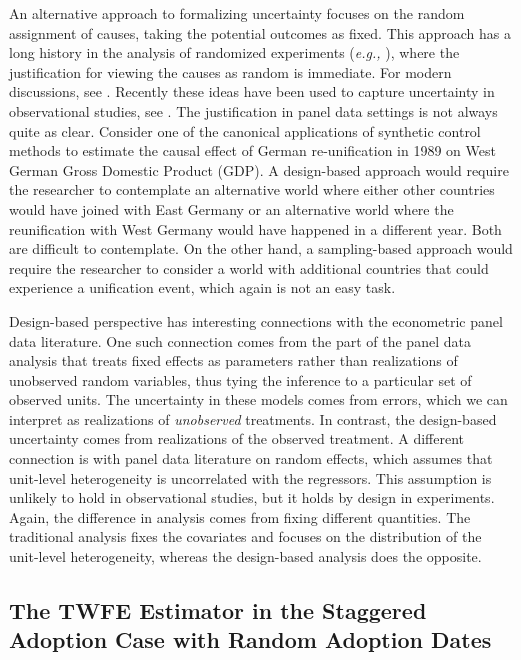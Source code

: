 \documentclass[letterpaper,12pt,leqno]{article}
\begin{document}
An alternative approach to formalizing uncertainty focuses on the random assignment of causes, taking the potential outcomes as fixed.
This approach has a long history in the analysis of randomized experiments 
({\it e.g.,} \citep{fisher1937design, neyman1923}), where the justification for viewing the causes as random is immediate. For modern discussions, see \citep{imbens2015causal, rosenbaum2023causal}.
Recently these ideas have been used to capture uncertainty in observational studies, see
\citep{abadie2020sampling, abadie2023should}. The justification in panel data settings is not always quite as clear.
Consider one of the canonical applications of synthetic control methods to estimate the causal effect of German re-unification in 1989 on West German Gross Domestic Product (GDP). 
A design-based approach would require the researcher to contemplate an alternative world where either other countries would have joined with East Germany or an alternative world where the reunification with West Germany would have happened in a different year. Both are difficult to contemplate. On the other hand, a sampling-based approach would require the researcher to consider a world with additional countries that could experience a unification event, which again is not an easy task. 

Design-based perspective has interesting connections with the econometric panel data literature. One such connection comes from the part of the panel data analysis that treats fixed effects as parameters rather than realizations of unobserved random variables, thus tying the inference to a particular set of observed units. The uncertainty in these models comes from errors, which we can interpret as realizations of {\it unobserved} treatments. In contrast, the design-based uncertainty comes from realizations of the observed treatment. A different connection is with panel data literature on random effects, which assumes that unit-level heterogeneity is uncorrelated with the regressors. This assumption is unlikely to hold in observational studies, but it holds by design in experiments. Again, the difference in analysis comes from fixing different quantities. The traditional analysis fixes the covariates and focuses on the distribution of the unit-level heterogeneity, whereas the design-based analysis does the opposite.



\subsection{The TWFE Estimator in the Staggered Adoption Case with Random Adoption Dates}
\end{document}
